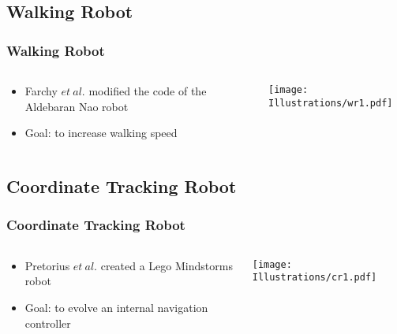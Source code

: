 \documentclass{beamer}
\begin{document}
\begin{frame}
\begin{frame}
\end{frame}

\subsection{Walking Robot}
\begin{frame}
  \frametitle{Walking Robot}

\begin{columns}
  \begin{column}{0.5\textwidth}
\begin{itemize}
\item  Farchy $et~al.$ modified the code of the Aldebaran Nao robot
\item Goal: to increase walking speed
\end{itemize}
\end{column}
\begin{column}{0.5\textwidth}
 \texttt{[image: Illustrations/wr1.pdf]}
       \\
\end{column}
\end{columns}
\end{frame}

\subsection{Coordinate Tracking Robot}
\begin{frame}
  \frametitle{Coordinate Tracking Robot}
\begin{columns}
  \begin{column}{0.5\textwidth}
\begin{itemize}
\item  Pretorius $et~al.$ created a Lego Mindstorms robot
\item Goal: to evolve an internal navigation controller
\end{itemize}
\end{column}
\begin{column}{0.5\textwidth}
 \texttt{[image: Illustrations/cr1.pdf]}
       \\
\end{column}
\end{columns}
\end{frame}


\end{frame}
\end{document}
